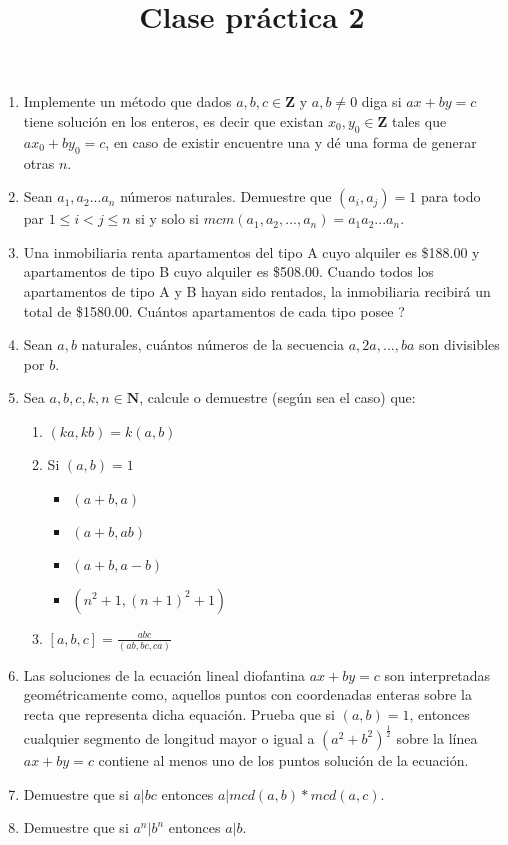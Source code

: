 \documentclass{article}
\begin{document}
\title{Clase pr\'actica 2}
\maketitle

\begin{enumerate}
    \item Implemente un m\'etodo que dados $a,b,c \in \mathbf{Z}$ y $a,b \neq 0$ diga si $ax + by =c$ tiene soluci\'on en los enteros, es decir que existan $x_0, y_0 \in \mathbf{Z}$ tales que $ax_0 + by_0 = c$, en caso de existir encuentre una y dé una forma de generar otras $n$.
    \item Sean $a_1, a_2 ... a_n$ n\'umeros naturales. Demuestre que $(a_i, a_j) = 1$ para todo par $1 \leq i < j \leq n$ si y solo si $mcm(a_1, a_2,...,a_n) = a_1a_2...a_n$.
    \item Una inmobiliaria renta apartamentos del tipo A cuyo alquiler es \$188.00 y apartamentos de tipo B cuyo alquiler es \$508.00. Cuando todos los apartamentos de tipo A y B hayan sido rentados, la inmobiliaria recibir\'a un total de \$1580.00. Cu\'antos apartamentos de cada tipo posee ?
    \item Sean $a,b$ naturales, cu\'antos n\'umeros de la secuencia $a, 2a, ..., ba$ son divisibles por $b$.
    \item Sea $a,b,c,k,n \in \mathbf{N}$, calcule o demuestre (seg\'un sea el caso) que:
    \begin{enumerate}
        \item $(ka, kb) = k (a,b)$
        \item Si $(a,b) = 1$
        \begin{itemize}
            \item $(a+b, a)$
            \item $(a+b, ab)$
            \item $(a+b, a-b)$
            \item $(n^2 +1, (n+1)^2 +1)$
        \end{itemize}
        \item $[a,b,c] = \frac{abc}{(ab,bc,ca)}$
    \end{enumerate}
    \item Las soluciones de la ecuación lineal diofantina $ax + by = c$ son interpretadas geométricamente como, aquellos puntos con coordenadas enteras sobre la recta que representa dicha equación. Prueba que si $(a, b) = 1$, entonces cualquier segmento de longitud mayor o igual a $(a^2 + b^2) ^ {\frac{1}{2}}$ sobre la línea $ax + by = c$ contiene al menos uno de los puntos solución de la ecuación.
    \item Demuestre que si $a | bc$ entonces $a | mcd(a,b) * mcd(a,c)$.
    \item Demuestre que si $a^n | b^n$ entonces $a | b$.
\end{enumerate}
\end{document}
